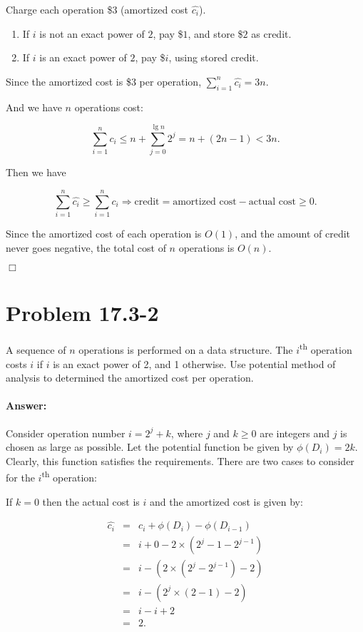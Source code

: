\documentclass[a4paper,10pt]{article}
\newcommand{\problem}[1]{\section*{Problem #1}}
\newcommand{\answer}{\paragraph{Answer:}}
\newcommand{\qed}{\hfill \ensuremath{\Box}}
\begin{document}
Charge each operation \$3 (amortized cost $\widehat{c_i}$).

\begin{enumerate}
\item If $i$ is not an exact power of $2$, pay \$$1$, and store \$$2$ as credit.
\item If $i$ is an exact power of $2$, pay \$$i$, using stored credit.
\end{enumerate}

Since the amortized cost is \$3 per operation, $\sum_{i=1}^{n}{\widehat{c_i}} = 3n$.

And we have $n$ operations cost:

$$\sum_{i=1}^{n}{c_i} \leq n + \sum_{j=0}^{\lg n}{2^j} = n + (2n - 1) < 3n.$$

Then we have 

$$\sum_{i=1}^{n}{\widehat{c_i}} \geq \sum_{i=1}^{n}{c_i} \Rightarrow 
	\text{credit} = \text{amortized cost} -  \text{actual cost} \geq 0.$$
	
Since the amortized cost of each operation is $O(1)$,
and the amount of credit never goes negative, the total cost of $n$ operations is $O(n)$.

\qed


\problem{17.3-2}

A sequence of $n$ operations is performed on a data structure. The $i$\textsuperscript{th} operation costs $i$ if $i$ is an exact power of 2, and 1 otherwise. 
Use potential method of analysis to determined the amortized cost per operation.


\answer

Consider operation number $i=2^j + k$, where $j$ and $k\geq 0$ are integers and $j$ is chosen as large as possible.
Let the potential function be given by $\phi(D_i) = 2k$. Clearly, this function satisfies the requirements.
There are two cases to consider for the $i$\textsuperscript{th} operation:

If $k=0$ then the actual cost is $i$ and the amortized cost is given by:

\begin{eqnarray*}
\widehat{c_i} &=& c_i + \phi(D_i) - \phi(D_{i-1})\\
&=&i + 0 - 2\times(2^j - 1 - 2^{j-1})\\
&=& i - (2\times(2^j - 2^{j-1}) -2)\\
&=& i  - (2^j \times (2 - 1) - 2)\\
&=& i - i + 2\\
&=& 2.
\end{eqnarray*}
\end{document}
